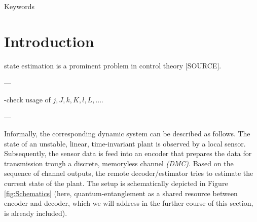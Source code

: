 \documentclass[conference]{IEEEtran}
\newcommand{\sdummy}{{\color{red}[SOURCE]}}
\begin{document}
\begin{IEEEkeywords}
	\color{red} Keywords
\end{IEEEkeywords}

\section{Introduction}\label{sec:Introduction}
	 state estimation is a prominent problem in control theory \sdummy.  

---

	-check usage of \(j,J,k,K,l,L,\ldots\).

---

	Informally, the corresponding dynamic system can be described as follows. The state of an unstable, linear, time-invariant plant is observed by a local sensor. 
	Subsequently, the sensor data is feed into an encoder that prepares the data for transmission trough a discrete, memoryless channel \emph{(DMC)}. 
	Based on the sequence of channel outputs, the remote decoder/estimator tries to estimate the current state of the plant. The setup is schematically depicted in Figure \ref{fig:Schematics} 
	(here, quantum-entanglement as a shared resource between encoder and decoder, which we will address in the further course of this section, is already included).
\end{document}
